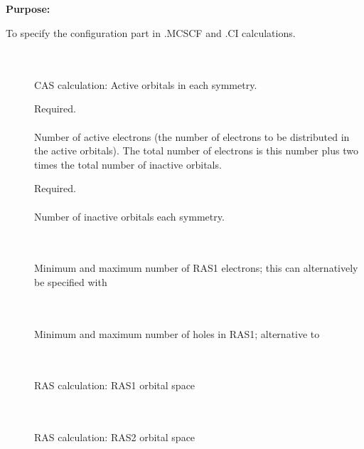 \pagebreak[3]
\subsection{\label{ref-wavinp}}

{\bf Purpose:}

To specify the configuration part in .MCSCF and .CI calculations.

\begin{description}
\item[] \ \\
   \\
  CAS calculation: Active orbitals in each symmetry.

\item[]
  Required.\\
   \\
  Number of active electrons (the number of
  electrons to be distributed in the active orbitals).
  The total number of electrons is this number
  plus two times the total number of inactive orbitals.

\item[]
  Required.\\
   \\
  Number of inactive orbitals each symmetry.

\item[] \ \\
    \\
   Minimum and maximum number of RAS1 electrons; this can alternatively
   be specified with 

\item[] \ \\
   \\
  Minimum and maximum number of holes in RAS1; alternative
  to 

\item[] \ \\
    \\
   RAS calculation: RAS1 orbital space

\item[] \ \\
    \\
   RAS calculation: RAS2 orbital space


\end{description}
